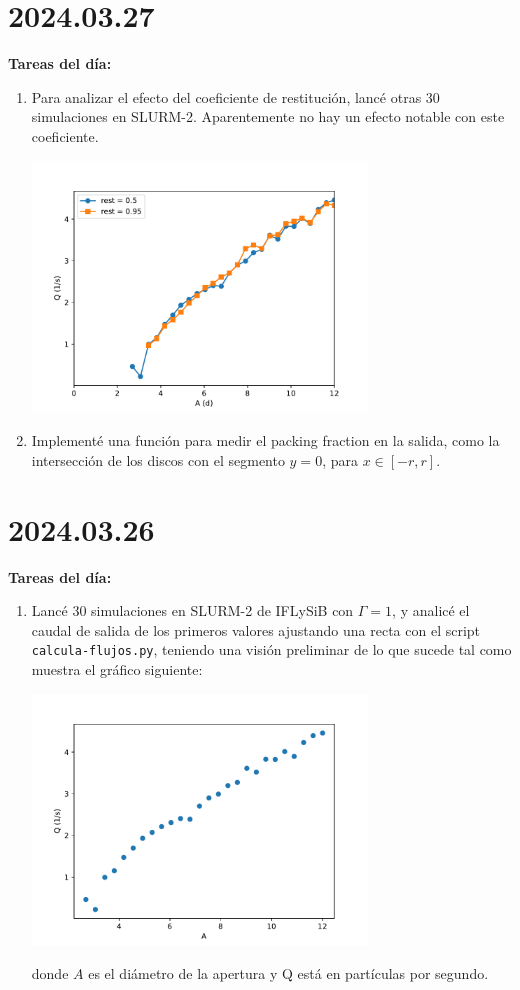 \documentclass[11pt]{article}
\begin{document}
\section*{2024.03.27}
\textbf{Tareas del día:}
\begin{enumerate}
\item Para analizar el efecto del coeficiente de restitución, lancé otras 30 simulaciones en SLURM-2. Aparentemente
    no hay un efecto notable con este coeficiente.
        \begin{center}
          \includegraphics[width=0.7\textwidth]{figs/q_r_rest.pdf}
        \end{center}
\item Implementé una función para medir el packing fraction en la salida, como la intersección de los discos
    con el segmento $y = 0$, para $x \in [-r, r]$.
\end{enumerate}

\section*{2024.03.26}
\textbf{Tareas del día:}
\begin{enumerate}
    \item Lancé 30 simulaciones en SLURM-2 de IFLySiB con $\Gamma = 1$, y analicé el caudal de salida de los primeros valores ajustando una 
        recta con el script \texttt{calcula-flujos.py}, teniendo una visión preliminar de lo que sucede tal como 
        muestra el gráfico siguiente:
        \begin{center}
          \includegraphics[width=0.7\textwidth]{figs/q_a.pdf}
        \end{center}
        donde $A$ es el diámetro de la apertura y Q está en partículas por segundo.
\end{enumerate}
\end{document}
